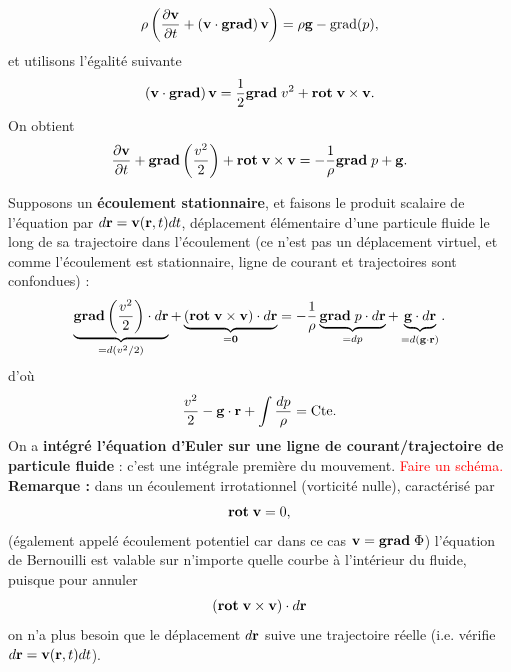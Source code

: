 \documentclass[11pt,a4paper]{report}
\begin{document}
\begin{equation}
	\rho\left(\frac{\partial\bold{v}}{\partial t}+\left(\bold{v}\cdot\textbf{grad}\right)\bold{v}\right)=\rho\bold{g}-\bold{\text{grad}}(p),
\end{equation}
et utilisons l'égalité suivante
\begin{equation}
	\left(\bold{v}\cdot\textbf{grad}\right)\bold{v} = \frac{1}{2}\textbf{grad}\;v^2 + \textbf{rot}\;\bold{v}\times\bold{v}.
\end{equation}
On obtient
\begin{equation}
	\frac{\partial\bold{v}}{\partial t} +  \textbf{grad}\left(\frac{v^2}{2}\right) + \textbf{rot}\;\bold{v}\times\bold{v}
	= - \frac{1}{\rho}\textbf{grad}\;p + \bold{g}.
\end{equation}

Supposons un \textbf{écoulement stationnaire}, et faisons le produit scalaire de l'équation par $d\bold{r} = \bold{v}(\bold{r},t)dt$, 
déplacement élémentaire d'une particule fluide le long de sa trajectoire dans l'écoulement (ce n'est pas un déplacement virtuel, et comme l'écoulement est stationnaire, ligne de courant et trajectoires sont confondues) :
\begin{equation}
	\underbrace{\textbf{grad}\left(\frac{v^2}{2}\right)\cdot d\bold{r}}_{=d(v^2/2)} 
	+ \underbrace{\left(\textbf{rot}\;\bold{v}\times\bold{v}\right)\cdot d\bold{r}}_{= \bold{0}}
	= - \frac{1}{\rho}\underbrace{\textbf{grad}\;p\cdot d\bold{r}}_{= dp} 
	+ \underbrace{\bold{g}\cdot d\bold{r}}_{= d\left(\bold{g}\cdot\bold{r}\right)}.
\end{equation}
d'où
\begin{equation}
	\frac{v^2}{2} -\bold{g}\cdot\bold{r} + \int\frac{dp}{\rho} = \text{Cte}.
\end{equation}
On a \textbf{intégré l'équation d'Euler sur une ligne de courant/trajectoire de particule fluide} : c'est une intégrale première du mouvement. 
\textcolor{red}{Faire un schéma.}\\

\textbf{Remarque :} dans un écoulement irrotationnel (vorticité nulle), caractérisé par
\begin{equation}
	\textbf{rot}\;\bold{v} = 0,
\end{equation}
(également appelé écoulement potentiel car dans ce cas $\bold{v} = \textbf{grad}\;\Phi$) l'équation de Bernouilli est valable sur n'importe quelle courbe à l'intérieur du fluide, puisque pour annuler
\begin{equation}
	\left(\textbf{rot}\;\bold{v}\times\bold{v}\right)\cdot d\bold{r}
\end{equation}
on n'a plus besoin que le déplacement $d\bold{r}$ suive une trajectoire réelle (i.e. vérifie $d\bold{r} = \bold{v}(\bold{r},t)dt$).
\end{document}

